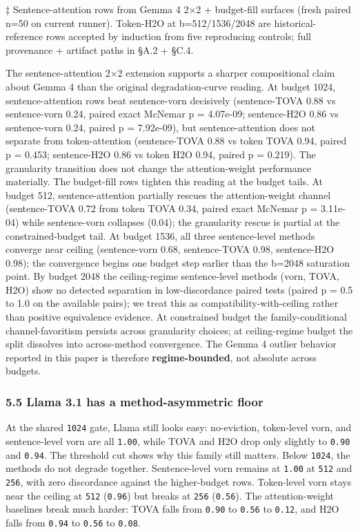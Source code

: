 \documentclass[
]{article}
\begin{document}
‡ Sentence-attention rows from Gemma 4 2×2 + budget-fill surfaces
(fresh paired n=50 on current runner). Token-H2O at b=512/1536/2048 are
historical-reference rows accepted by induction from five reproducing
controls; full provenance + artifact paths in §A.2 + §C.4.

The sentence-attention 2×2 extension supports a sharper compositional
claim about Gemma 4 than the original degradation-curve reading. At
budget 1024, sentence-attention rows beat sentence-vorn decisively
(sentence-TOVA 0.88 vs sentence-vorn 0.24, paired exact McNemar p
= 4.07e-09; sentence-H2O 0.86 vs sentence-vorn 0.24, paired p =
7.92e-09), but sentence-attention does not separate from token-attention
(sentence-TOVA 0.88 vs token TOVA 0.94, paired p = 0.453;
sentence-H2O 0.86 vs token H2O 0.94, paired p = 0.219). The
granularity transition does not change the attention-weight performance
materially. The budget-fill rows tighten this reading at the
budget tails. At budget 512, sentence-attention partially rescues the
attention-weight channel (sentence-TOVA 0.72 from token TOVA
0.34, paired exact McNemar p = 3.11e-04) while sentence-vorn collapses
(0.04); the granularity rescue is partial at the constrained-budget
tail. At budget 1536, all three sentence-level methods converge near
ceiling (sentence-vorn 0.68, sentence-TOVA 0.98,
sentence-H2O 0.98); the convergence begins one budget step earlier
than the b=2048 saturation point. By budget 2048 the ceiling-regime
sentence-level methods (vorn, TOVA, H2O) show no detected
separation in low-discordance paired tests (paired p = 0.5 to 1.0 on the
available pairs); we treat this as compatibility-with-ceiling rather
than positive equivalence evidence. At constrained budget the
family-conditional channel-favoritism persists across granularity
choices; at ceiling-regime budget the split dissolves into across-method
convergence. The Gemma 4 outlier behavior reported in
this paper is therefore \textbf{regime-bounded}, not absolute across
budgets.

\subsubsection{5.5 Llama 3.1 has a method-asymmetric
floor}\label{55-llama-31-has-a-method-asymmetric-floor}

At the shared \texttt{1024} gate, Llama still looks easy: no-eviction,
token-level vorn, and sentence-level vorn are all \texttt{1.00}, while
TOVA and H2O drop only slightly to \texttt{0.90} and
\texttt{0.94}. The threshold cut shows why this family still matters.
Below \texttt{1024}, the methods do not degrade together. Sentence-level
vorn remains at \texttt{1.00} at \texttt{512} and \texttt{256}, with
zero discordance against the higher-budget rows. Token-level vorn stays
near the ceiling at \texttt{512} (\texttt{0.96}) but breaks at
\texttt{256} (\texttt{0.56}). The attention-weight baselines break much
harder: TOVA falls from \texttt{0.90} to \texttt{0.56} to
\texttt{0.12}, and H2O falls from \texttt{0.94} to \texttt{0.56}
to \texttt{0.08}.
\end{document}
